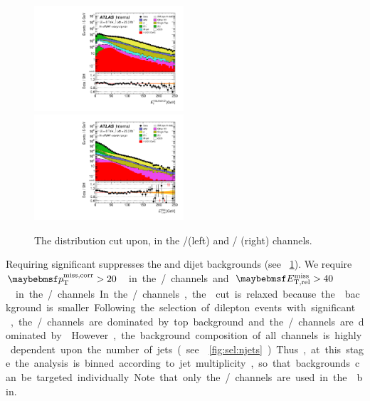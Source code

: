 \begin{figure}
	\includegraphics[width=0.495\textwidth]{tex/selection/emme_CutZVeto_MET_TrackHWW_Clj_mh125_log}
	\hfill
	\includegraphics[width=0.495\textwidth]{tex/selection/eemm_CutZVeto_METRel_mh125_log}
	\caption{The \met distribution cut upon, in the \emch/\mech (left) and \eech/\mmch 
	(right) channels.}
	\label{fig:sel:met}
\end{figure}

Requiring significant \met suppresses the \DYll and dijet backgrounds (see 
\Figure~\ref{fig:sel:met}). We require \unit{$\corrtrackmet > 20$}{\GeV} in the 
\emch/\mech channels and \unit{$\metrel > 40$}{\GeV} in the \eech/\mmch channels. In the 
\emch/\mech channels, the \met cut is relaxed because the \DYll background is smaller. 

Following the selection of dilepton events with significant \met, the \emch/\mech 
channels are dominated by top background and the \eech/\mmch channels are dominated by 
\DYll. However, the background composition of all channels is highly dependent upon the 
number of jets (see \Figure~\ref{fig:sel:njets}). Thus, at this stage the analysis is 
binned according to jet multiplicity, so that backgrounds can be targeted individually.
Note that only the \emch/\mech channels are used in the \twojet bin.


